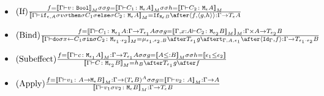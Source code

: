 {\begin{itemize}
 
    \item $\treerule{If}{f = \deno{\typerelation{\G}{v}{\B}}\s\s g = \deno{\typerelation{\G}{C_1}{\mea}}\s\s h = \deno{\typerelation{\G}{C_2}{\mea}}}{\deno{{\typerelation{\G}{\ifthenelse{\e}{A}{v}{C_1}{C_2}}{\mea}}} = \ifnt{\meb} \after \pr{f}{\pr{g}{h}} : \G \rightarrow \tea}$
        
    \item $\treerule{Bind}{f = \deno{\typerelation{\G}{C_1}{\M{\e_1}{A}} : \G \rightarrow \T{\e_1}{A}\s\s g = \deno{\typerelation{\gax}{C_2}{\M{\e_2}{B}}}}: \G \times A \rightarrow \T{\e_2}{B}}{\deno{\typerelation{\G}{\doin{x}{C_1}{C_2}}{\M{\e_1 \dot \e_2}}} = \bind{\e_1}{\e_2}{B} \after \T{\e_1}{g} \after \tstrength{\G}{A}{\e_1} \after \pr{\idg}{f}: \G \rightarrow \T{\e_1 \dot \e_2}{B}}$ 
    \item  $\treerule{Subeffect}{f = \deno{\typerelation{\G}{c}{\M{\e_1}{A}}}: \G \rightarrow \T{\e_1}{A} \s\s g = \deno{A \subtype B}\s\s h = \dse{\e_1}{\e_2}}{\deno{\typerelation{\G}{C}{\M{\e_2}{B}}} = h_B \after \T{\e_1}{g} \after f}$
    \item $(\text{Apply}) \frac{f = {\bf [\![}\Gamma \vdash v_1 \colon A \rightarrow \texttt{M}_{\epsilon}{B}{\bf ]\!]}_M: \Gamma \rightarrow (T_{\epsilon}{B})^{A} \sigma\sigma g={\bf [\![}\Gamma \vdash v_2 \colon A{\bf ]\!]}_M: \Gamma \rightarrow A}{{\bf [\![}\Gamma \vdash v_1\sigma v_2 \colon \texttt{M}_{\epsilon}{B}{\bf ]\!]}_M: \Gamma \rightarrow T_{\epsilon}{B}}$
\end{itemize}
}
\ifdefined\NoDocument
\else
\documentclass{report}


    \Denotations

\fi